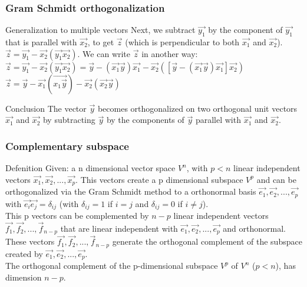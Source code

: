 \begin{frame}
	\frametitle{Gram Schmidt orthogonalization}
	\begin{block}{Generalization to multiple vectors}
		Next, we subtract $\overrightarrow{y_1}$ by the component of $\overrightarrow{y_1}$ that is parallel with $\overrightarrow{x_2}$, to get $\overrightarrow{z}$ (which is perpendicular to both $\overrightarrow{x_1}$ and $\overrightarrow{x_2}$).\\
		$\overrightarrow{z}=\overrightarrow{y_1}-\overrightarrow{x_2}(\overrightarrow{y_1}\overrightarrow{x_2})$. We can write $\overrightarrow{z}$ in another way:\\
		$\overrightarrow{z}=\overrightarrow{y_1}-\overrightarrow{x_2}(\overrightarrow{y_1}\overrightarrow{x_2})=\overrightarrow{y}-(\overrightarrow{x_1}\overrightarrow{y})\overrightarrow{x_1}-\overrightarrow{x_2}([\overrightarrow{y}-(\overrightarrow{x_1}\overrightarrow{y})\overrightarrow{x_1}]\overrightarrow{x_2})$
		$\overrightarrow{z}=\overrightarrow{y}-\overrightarrow{x_1}(\overrightarrow{x_1\overrightarrow{y}})-\overrightarrow{x_2}(\overrightarrow{x_2}\overrightarrow{y})$
	\end{block} 
	\begin{block}{Conclusion}
		The vector $\overrightarrow{y}$ becomes orthogonalized on two orthogonal unit vectors $\overrightarrow{x_1}$ and $\overrightarrow{x_2}$ by subtracting $\overrightarrow{y}$ by the components of $\overrightarrow{y}$ parallel with $\overrightarrow{x_1}$ and $\overrightarrow{x_2}$.
	\end{block}
\end{frame}

\begin{frame}
	\frametitle{Complementary subspace}
	\begin{block}{Defenition}
		Given: a n dimensional vector space $V^n$, with $p<n$ linear independent vectors $\overrightarrow{x_1},\overrightarrow{x_2},...,\overrightarrow{x_p}$. This vectors create a p dimensional subspace $V^p$ and can be orthogonalized via the Gram Schmidt method to a orthonormal basis $\overrightarrow{e_1},\overrightarrow{e_2},...,\overrightarrow{e_p}$ with $\overrightarrow{e_i}\overrightarrow{e_j}=\delta_{ij}$ (with $\delta_{ij}=1$ if $i=j$ and $\delta_{ij}=0$ if $i\neq j$).\\
		This p vectors can be complemented by $n-p$ linear independent vectors $\overrightarrow{f_1},\overrightarrow{f_2},...,\overrightarrow{f}_{n-p}$ that are linear independent with $\overrightarrow{e_1},\overrightarrow{e_2},...,\overrightarrow{e_p}$ and orthonormal.\\
		\vspace{4mm}
		These vectors $\overrightarrow{f_1},\overrightarrow{f_2},...,\overrightarrow{f}_{n-p}$ generate the orthogonal complement of the subspace created by $\overrightarrow{e_1},\overrightarrow{e_2},...,\overrightarrow{e_p}$. \\
		The orthogonal complement of the p-dimensional subspace $V^p$ of $V^n$ ($p<n$), has dimension $n-p$.
	\end{block}
\end{frame}
					
